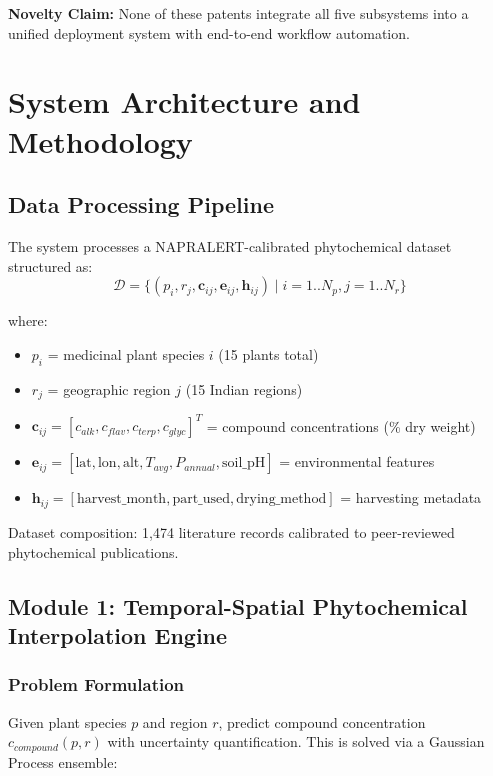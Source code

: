 \documentclass[11pt,a4paper]{article}
\begin{document}
\textbf{Novelty Claim:} None of these patents integrate all five subsystems into a unified deployment system with end-to-end workflow automation.

\section{System Architecture and Methodology}

\subsection{Data Processing Pipeline}

The system processes a NAPRALERT-calibrated phytochemical dataset structured as:
\[
\mathcal{D} = \{(p_i, r_j, \mathbf{c}_{ij}, \mathbf{e}_{ij}, \mathbf{h}_{ij}) \mid i=1..N_p, j=1..N_r\}
\]

where:
\begin{itemize}
    \item $p_i$ = medicinal plant species $i$ (15 plants total)
    \item $r_j$ = geographic region $j$ (15 Indian regions)
    \item $\mathbf{c}_{ij} = [c_{alk}, c_{flav}, c_{terp}, c_{glyc}]^T$ = compound concentrations (\% dry weight)
    \item $\mathbf{e}_{ij} = [\text{lat}, \text{lon}, \text{alt}, T_{avg}, P_{annual}, \text{soil\_pH}]$ = environmental features
    \item $\mathbf{h}_{ij} = [\text{harvest\_month}, \text{part\_used}, \text{drying\_method}]$ = harvesting metadata
\end{itemize}

Dataset composition: 1,474 literature records calibrated to peer-reviewed phytochemical publications.

\subsection{Module 1: Temporal-Spatial Phytochemical Interpolation Engine}

\subsubsection{Problem Formulation}

Given plant species $p$ and region $r$, predict compound concentration $c_{compound}(p, r)$ with uncertainty quantification. This is solved via a Gaussian Process ensemble:
\end{document}
